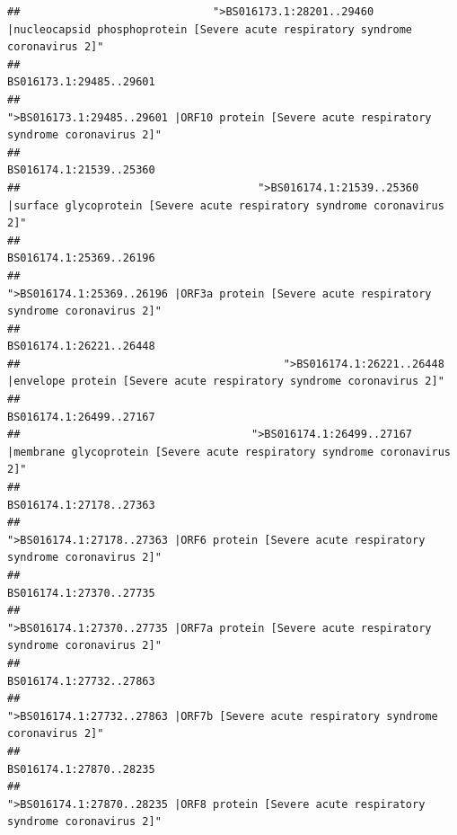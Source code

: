 \documentclass[
]{article}
\begin{document}
\begin{verbatim}
##                              ">BS016173.1:28201..29460 |nucleocapsid phosphoprotein [Severe acute respiratory syndrome coronavirus 2]" 
##                                                                                                                BS016173.1:29485..29601 
##                                            ">BS016173.1:29485..29601 |ORF10 protein [Severe acute respiratory syndrome coronavirus 2]" 
##                                                                                                                BS016174.1:21539..25360 
##                                     ">BS016174.1:21539..25360 |surface glycoprotein [Severe acute respiratory syndrome coronavirus 2]" 
##                                                                                                                BS016174.1:25369..26196 
##                                            ">BS016174.1:25369..26196 |ORF3a protein [Severe acute respiratory syndrome coronavirus 2]" 
##                                                                                                                BS016174.1:26221..26448 
##                                         ">BS016174.1:26221..26448 |envelope protein [Severe acute respiratory syndrome coronavirus 2]" 
##                                                                                                                BS016174.1:26499..27167 
##                                    ">BS016174.1:26499..27167 |membrane glycoprotein [Severe acute respiratory syndrome coronavirus 2]" 
##                                                                                                                BS016174.1:27178..27363 
##                                             ">BS016174.1:27178..27363 |ORF6 protein [Severe acute respiratory syndrome coronavirus 2]" 
##                                                                                                                BS016174.1:27370..27735 
##                                            ">BS016174.1:27370..27735 |ORF7a protein [Severe acute respiratory syndrome coronavirus 2]" 
##                                                                                                                BS016174.1:27732..27863 
##                                                    ">BS016174.1:27732..27863 |ORF7b [Severe acute respiratory syndrome coronavirus 2]" 
##                                                                                                                BS016174.1:27870..28235 
##                                             ">BS016174.1:27870..28235 |ORF8 protein [Severe acute respiratory syndrome coronavirus 2]" 

\end{verbatim}
\end{document}
